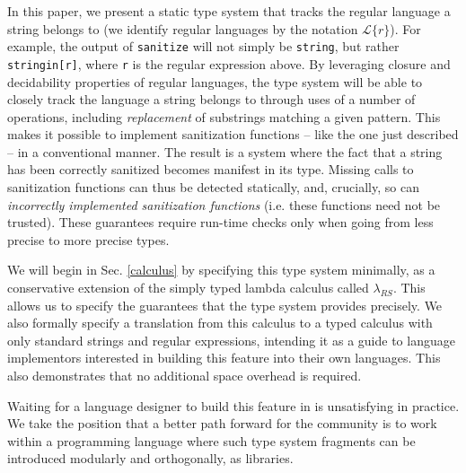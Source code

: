 \documentclass[10pt]{sigplanconf}
\theoremstyle{definition}
\newcommand{\lambdas}{\lambda_{RS}}
\begin{document}
In this paper, we present a static type system that tracks the regular language a string belongs to (we identify regular languages by the notation $\mathcal{L}\{r\}$). For example, the output of \verb|sanitize| will not simply be \verb|string|, but rather \verb|stringin[r]|, where \verb|r| is the regular expression above. By leveraging closure and decidability properties of regular languages, the type system will be able to closely track the language a string belongs to through uses of a number of operations, including \emph{replacement} of substrings matching a given pattern. This makes it possible to implement sanitization functions -- like the one just described -- in a conventional manner. The result is a system where the fact that a string has been {correctly} sanitized becomes manifest in its type. Missing calls to sanitization functions can thus be detected statically, and, crucially, so can \emph{incorrectly implemented sanitization functions} (i.e. these functions need not be trusted). These guarantees require run-time checks only when going from less precise to more precise types. %

We will begin in Sec. \ref{calculus} by specifying this type system minimally, as a conservative extension of the simply typed lambda calculus called $\lambdas$. This allows us to specify the guarantees that the type system provides precisely. We also formally specify a translation from this calculus to a typed calculus with only standard strings and regular expressions, intending it as a guide to language implementors interested in building this feature into their own languages. This also demonstrates that no additional space overhead is required.

Waiting for a language designer to build this feature in is unsatisfying in practice. %
We take the position that a better path forward for the community is to work within a programming language where such type system fragments can be introduced modularly and orthogonally, as libraries. 
\end{document}
